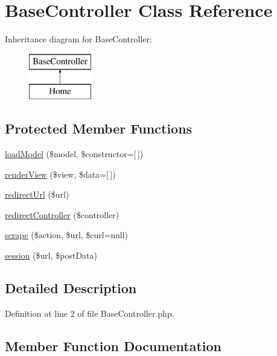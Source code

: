 \hypertarget{class_base_controller}{}\section{Base\+Controller Class Reference}
\label{class_base_controller}
Inheritance diagram for Base\+Controller\+:\begin{figure}[H]
\begin{center}
\leavevmode
\includegraphics[height=2.000000cm]{class_base_controller}
\end{center}
\end{figure}
\subsection*{Protected Member Functions}
\begin{DoxyCompactItemize}
\item 
\hyperlink{class_base_controller_a5fa8890bd3a9d20f5c0cc2377dc49eb1}{load\+Model} (\$model, \$constructor=\mbox{[}$\,$\mbox{]})
\item 
\hyperlink{class_base_controller_aa0c49b95cd8e5ff8ff61b4a2c35bf1eb}{render\+View} (\$view, \$data=\mbox{[}$\,$\mbox{]})
\item 
\hyperlink{class_base_controller_a9f95c7503770ed9c974005b363ec3d00}{redirect\+Url} (\$url)
\item 
\hyperlink{class_base_controller_a85ddb683efc64655be063b697f631beb}{redirect\+Controller} (\$controller)
\item 
\hyperlink{class_base_controller_abd4f25604b09a96c254491df97612cc3}{scrape} (\$action, \$url, \$curl=null)
\item 
\hyperlink{class_base_controller_a259a554926fc05640c8c711c340cdeac}{session} (\$url, \$post\+Data)
\end{DoxyCompactItemize}


\subsection{Detailed Description}


Definition at line 2 of file Base\+Controller.\+php.



\subsection{Member Function Documentation}
\hypertarget{class_base_controller_a5fa8890bd3a9d20f5c0cc2377dc49eb1}{}\label{class_base_controller_a5fa8890bd3a9d20f5c0cc2377dc49eb1} 
